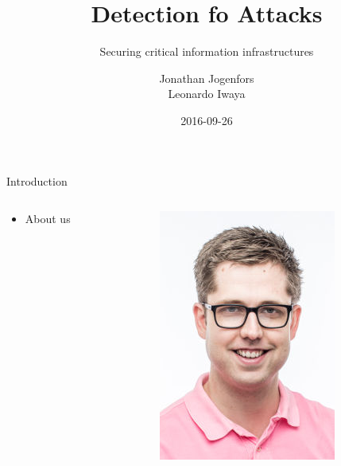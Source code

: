 \documentclass[compress]{beamer}
\title{Detection fo Attacks}
\subtitle{Securing critical information infrastructures}
\author{Jonathan Jogenfors\\ Leonardo Iwaya}
\date{2016-09-26}
\begin{document}
\small
\frame{\titlepage}
\begin{frame}{Introduction}
    \begin{columns}
        \begin{column}{0.8\textwidth}
    \begin{itemize}
        \item About us
    \end{itemize}
        \end{column}
        \begin{column}{0.2\textwidth}  %
            \begin{center}

                \includegraphics[width=\textwidth]{jonathan.jpg}


            \end{center}
        \end{column}
    \end{columns}
\end{frame}
\end{document}
